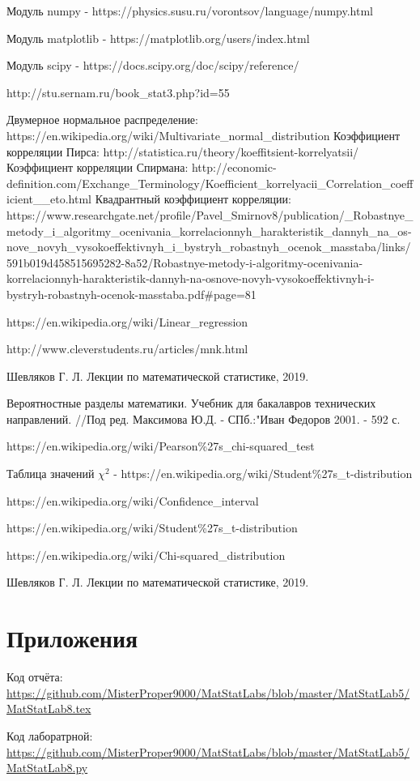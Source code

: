 \documentclass[a4]{article}
\begin{document}
\begin{thebibliography}{}
      Модуль numpy  -  https://physics.susu.ru/vorontsov/language/numpy.html
    
    Модуль matplotlib - https://matplotlib.org/users/index.html
    
    Модуль scipy - https://docs.scipy.org/doc/scipy/reference/
    
    
    
    http://stu.sernam.ru/book\_stat3.php?id=55
    
Двумерное нормальное распределение: https://en.wikipedia.org/wiki/Multivariate\_normal\_distribution
Коэффициент корреляции Пирса: http://statistica.ru/theory/koeffitsient-korrelyatsii/ 
Коэффициент корреляции Спирмана: 
http://economic-definition.com/Exchange\_Terminology/Koefficient\_korrelyacii\_Correlation\_coefficient\_\_eto.html
 Квадрантный коэффициент корреляции: https://www.researchgate.net/profile/Pavel\_Smirnov8/publication/\_Robastnye\_metody\_i\_algoritmy\_ocenivania\_korrelacionnyh\_harakteristik\_dannyh\_na\_os\do-nove\_novyh\_vysokoeffektivnyh\_i\_bystryh\_robastnyh\_ocenok\_masstaba/links/591b019d458515695282\do-8a52/Robastnye-metody-i-algoritmy-ocenivania-korrelacionnyh-harakteristik-dannyh-na-osnove-novyh-vysokoeffektivnyh-i-bystryh-robastnyh-ocenok-masstaba.pdf\#page=81
    
    
    https://en.wikipedia.org/wiki/Linear\_regression

http://www.cleverstudents.ru/articles/mnk.html

Шевляков Г. Л. Лекции по математической статистике, 2019.

Вероятностные разделы математики. Учебник для бакалавров технических направлений. //Под ред. Максимова Ю.Д. - СПб.:"Иван Федоров 2001. - 592 с.
    
    
    
https://en.wikipedia.org/wiki/Pearson\%27s\_chi-squared\_test

Таблица значений $\chi^2$ -  https://en.wikipedia.org/wiki/Student\%27s\_t-distribution

    
    

https://en.wikipedia.org/wiki/Confidence\_interval

https://en.wikipedia.org/wiki/Student\%27s\_t-distribution

https://en.wikipedia.org/wiki/Chi-squared\_distribution

Шевляков Г. Л. Лекции по математической статистике, 2019.

\end{thebibliography}

\section{Приложения}


Код отчёта:\; \url{https://github.com/MisterProper9000/MatStatLabs/blob/master/MatStatLab5/MatStatLab8.tex}

Код лаборатрной:\; \url{https://github.com/MisterProper9000/MatStatLabs/blob/master/MatStatLab5/MatStatLab8.py}

%
\end{document}
